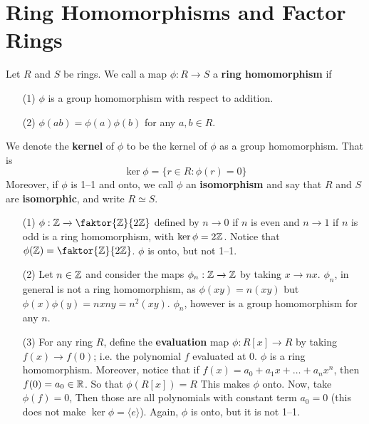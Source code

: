 \section{Ring Homomorphisms and Factor Rings}
\label{section_5.3}

\begin{definition}
  Let $R$ and  $S$ be rings. We call a map  $\phi:R \xrightarrow{} S$ a
  \textbf{ring homomorphism} if
  \begin{enumerate}
    \item[(1)] $\phi$ is a group homomorphism with respect to addition.

    \item[(2)] $\phi(ab)=\phi(a)\phi(b)$ for any $a,b \in R$.
  \end{enumerate}
  We denote the \textbf{kernel} of $\phi$ to be the kernel of $\phi$ as a
  group homomorphism. That is
  \begin{equation*}
    \ker{\phi}=\{r \in R : \phi(r)=0\}
  \end{equation*}
  Moreover, if $\phi$ is 1--1 and onto, we call $\phi$ an \textbf{isomorphism}
  and say that $R$ and $S$ are \textbf{isomorphic}, and write $R \simeq S$.
\end{definition}

\begin{example}\label{example_5.9}
  \begin{enumerate}
    \item[(1)] $\phi:\Z \xrightarrow{} \faktor{\Z}{2\Z}$ defined by $n
      \xrightarrow{} 0$ if $n$ is even and  $n \xrightarrow{} 1$ if $n$ is
      odd is a ring homomorphism, with  $\ker{\phi}=2\mathbb{Z}$. Notice that
      $\phi(\Z)=\faktor{\Z}{2\Z}$. $\phi$ is onto, but not 1--1.

    \item[(2)] Let $n \in \mathbb{Z}$ and consider the maps  $\phi_n:\mathbb{Z}
      \xrightarrow{} \mathbb{Z}$ by taking $x \xrightarrow{} nx$. $\phi_n$, in
      general is not a ring homomorphism, as  $\phi(xy)=n(xy)$ but
      $\phi(x)\phi(y)=nxny=n^2(xy)$. $\phi_n$, however is a group
      homomorphism for any $n$.

    \item[(3)] For any ring $R$, define the \textbf{evaluation} map
      $\phi:R[x] \xrightarrow{} R$ by taking $f(x) \xrightarrow{} f(0)$;
      i.e. the polynomial $f$ evaluated at $0$.  $\phi$ is a ring
      homomorphism. Moreover, notice that if
      $f(x)=a_0+a_1x+\dots+a_nx^n$, then $f(0)=a_0 \in \mathbb{R}$. So that
      $\phi(R[x])=R$ This makes $\phi$ onto. Now, take  $\phi(f)=0$, Then
      those are all polynomials with constant term $a_0=0$ (this does not
      make $\ker{\phi}=\langle e \rangle$). Again, $\phi$ is onto, but it
      is not 1--1.
  \end{enumerate}
\end{example}

